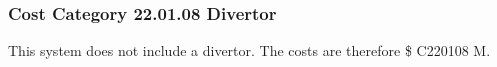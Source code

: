 \subsubsection*{Cost Category 22.01.08 Divertor}

This system does not include a divertor. The costs are therefore \$ C220108 M.
